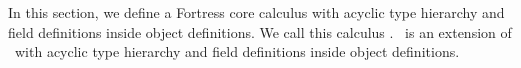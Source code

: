 %
%
%
%

\section{\acffdcore}\label{acffd-calculus}

In this section, we define a Fortress core calculus with
acyclic type hierarchy and field definitions inside object definitions.
We call this calculus \emph{\acffdcore}.
\acffdcore\ is an extension of \basiccore\ with 
acyclic type hierarchy and field definitions inside object definitions.





